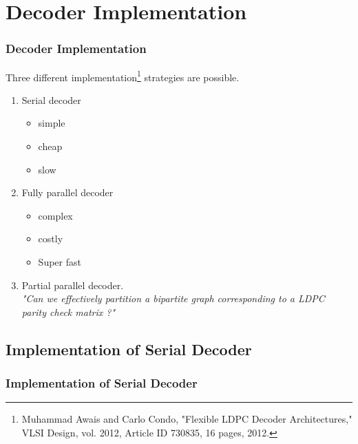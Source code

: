 \documentclass[xcolor=dvipsname]
{beamer}
\begin{document}
\section{Decoder Implementation}
				\begin{frame} 
					\frametitle{ Decoder Implementation }
  Three different implementation\footnote{Muhammad Awais and Carlo Condo, "Flexible LDPC Decoder Architectures," VLSI Design, vol. 2012, Article ID 730835, 16 pages, 2012.} strategies are possible.
						\begin{enumerate}
							\item Serial decoder
							\begin{itemize}
							\item simple
							\item cheap
							\item slow
							\end{itemize}
							\item Fully parallel decoder
							\begin{itemize}
							\item complex
							\item costly
							\item Super fast
							\end{itemize}
							\item Partial parallel decoder. \\
\textit{"Can we effectively partition a bipartite graph corresponding to a LDPC parity check matrix ?"	}					
						\end{enumerate}
				\end{frame}	


\subsection{Implementation of Serial Decoder }


\begin{frame}[t]
\frametitle{ Implementation of Serial Decoder }  

\end{frame}
\end{document}

